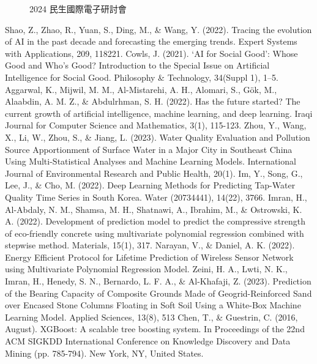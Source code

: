 \documentclass[12pt,a4paper]{article}
\begin{document}
\begin{enumerate}
\begin{enumerate}[label=\arabic*.]
\begin{figure}[H]
\begin{minipage}[t]{0.45\textwidth}
                \caption{2024 民生國際電子研討會}
                \label{fig:iwce}
            \end{minipage}
        \end{figure}
\end{enumerate}

\begin{thebibliography}{99}
 Shao, Z., Zhao, R., Yuan, S., Ding, M., \& Wang, Y. (2022). Tracing the evolution of AI in the past decade and forecasting the emerging trends. Expert Systems with Applications, 209, 118221.
 Cowls, J. (2021). ‘AI for Social Good’: Whose Good and Who’s Good? Introduction to the Special Issue on Artificial Intelligence for Social Good. Philosophy \& Technology, 34(Suppl 1), 1–5.
 Aggarwal, K., Mijwil, M. M., Al-Mistarehi, A. H., Alomari, S., Gök, M., Alaabdin, A. M. Z., \& Abdulrhman, S. H. (2022). Has the future started? The current growth of artificial intelligence, machine learning, and deep learning. Iraqi Journal for Computer Science and Mathematics, 3(1), 115-123.
 Zhou, Y., Wang, X., Li, W., Zhou, S., \& Jiang, L. (2023). Water Quality Evaluation and Pollution Source Apportionment of Surface Water in a Major City in Southeast China Using Multi-Statistical Analyses and Machine Learning Models. International Journal of Environmental Research and Public Health, 20(1).
 Im, Y., Song, G., Lee, J., \& Cho, M. (2022). Deep Learning Methods for Predicting Tap-Water Quality Time Series in South Korea. Water (20734441), 14(22), 3766.
 Imran, H., Al-Abdaly, N. M., Shamsa, M. H., Shatnawi, A., Ibrahim, M., \& Ostrowski, K. A. (2022). Development of prediction model to predict the compressive strength of eco-friendly concrete using multivariate polynomial regression combined with stepwise method. Materials, 15(1), 317.
 Narayan, V., \& Daniel, A. K. (2022). Energy Efficient Protocol for Lifetime Prediction of Wireless Sensor Network using Multivariate Polynomial Regression Model.
 Zeini, H. A., Lwti, N. K., Imran, H., Henedy, S. N., Bernardo, L. F. A., \& Al-Khafaji, Z. (2023). Prediction of the Bearing Capacity of Composite Grounds Made of Geogrid-Reinforced Sand over Encased Stone Columns Floating in Soft Soil Using a White-Box Machine Learning Model. Applied Sciences, 13(8), 513
 Chen, T., \& Guestrin, C. (2016, August). XGBoost: A scalable tree boosting system. In Proceedings of the 22nd ACM SIGKDD International Conference on Knowledge Discovery and Data Mining (pp. 785-794). New York, NY, United States.

\end{thebibliography}
\end{enumerate}
\end{document}
